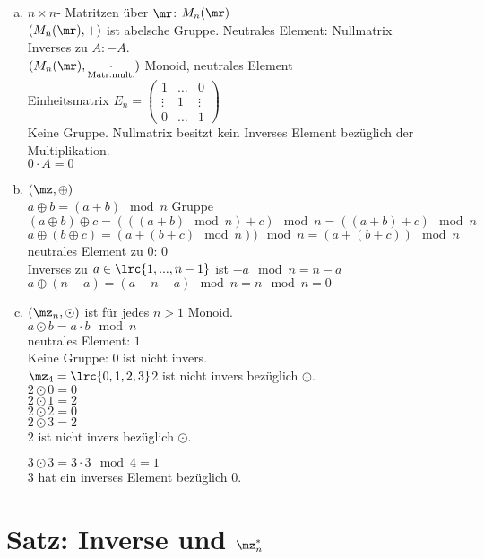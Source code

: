 \begin{enumerate}[a)]
		\item $n\times n$- Matritzen über $\mr$: $M_n(\mr)$\\
		$(M_n(\mr),+)$ ist abelsche Gruppe. Neutrales Element: Nullmatrix\\
		Inverses zu $A:-A$.\\
		$(M_n(\mr),\underset{\mbox{\scriptsize Matr.mult.}}{\cdot})$ Monoid, neutrales Element\\
		Einheitsmatrix $E_n=\begin{pmatrix}1&\dots&0\\\vdots&1&\vdots\\0&\dots&1
		\end{pmatrix}$\\
		Keine Gruppe. Nullmatrix besitzt kein Inverses Element bezüglich der Multiplikation.\\
		$0\cdot A=0$
		\item $(\mz,\oplus)$\\
		$a\oplus b=(a+b)\mod n$ Gruppe\\
		$(a\oplus b)\oplus c=(((a+b)\mod n)+c)\mod n=((a+b)+c)\mod n$\\
		$a\oplus(b\oplus c)=(a+(b+c)\mod n))\mod n=(a+(b+c))\mod n$\\
		neutrales Element zu $0$: $0$\\
		Inverses zu $a\in\lrc{1,...,n-1}$ ist $-a\mod n=n-a$\\
		$a\oplus(n-a)=(a+n-a)\mod n=n\mod n=0$
		\item $(\mz_n,\odot)$ ist für jedes $n>1$ Monoid.\\
		$a\odot b=a\cdot b\mod n$\\
		neutrales Element: $1$\\
		Keine Gruppe: $0$ ist nicht invers.\\
		$\mz_4=\lrc{0,1,2,3}$\quad $2$ ist nicht invers bezüglich $\odot$.\\
		$2\odot 0=0$\\
		$2\odot 1=2$\\
		$2\odot 2=0$\\
		$2\odot 3=2$\\
		$2$ ist nicht invers bezüglich $\odot$.

		$3\odot 3=3\cdot 3\mod 4=1$\\
		$3$ hat ein inverses Element bezüglich $0$.
	\end{enumerate}

	\section{Satz: Inverse und \texorpdfstring{$\mz^*_n$}{Z*}}

